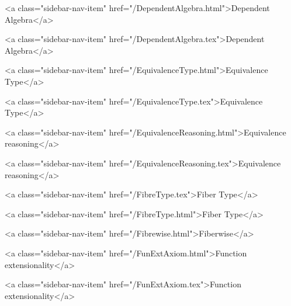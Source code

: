       
    
      
        
          <a class="sidebar-nav-item" href="/DependentAlgebra.html">Dependent Algebra</a>
        
      
    
      
        
          <a class="sidebar-nav-item" href="/DependentAlgebra.tex">Dependent Algebra</a>
        
      
    
      
        
          <a class="sidebar-nav-item" href="/EquivalenceType.html">Equivalence Type</a>
        
      
    
      
        
          <a class="sidebar-nav-item" href="/EquivalenceType.tex">Equivalence Type</a>
        
      
    
      
        
          <a class="sidebar-nav-item" href="/EquivalenceReasoning.html">Equivalence reasoning</a>
        
      
    
      
        
          <a class="sidebar-nav-item" href="/EquivalenceReasoning.tex">Equivalence reasoning</a>
        
      
    
      
        
          <a class="sidebar-nav-item" href="/FibreType.tex">Fiber Type</a>
        
      
    
      
        
          <a class="sidebar-nav-item" href="/FibreType.html">Fiber Type</a>
        
      
    
      
        
          <a class="sidebar-nav-item" href="/Fibrewise.html">Fiberwise</a>
        
      
    
      
        
          <a class="sidebar-nav-item" href="/FunExtAxiom.html">Function extensionality</a>
        
      
    
      
        
          <a class="sidebar-nav-item" href="/FunExtAxiom.tex">Function extensionality</a>
        

